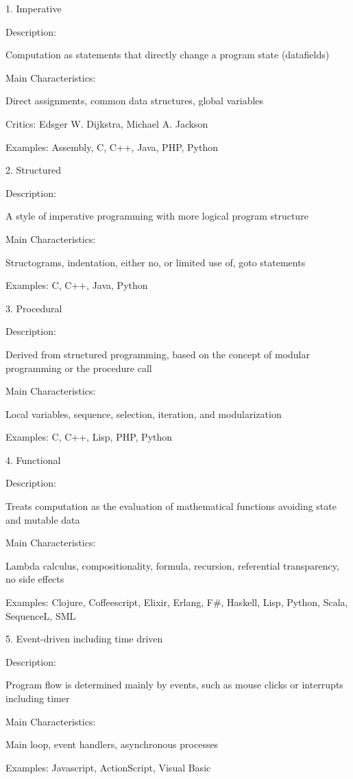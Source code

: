 1. Imperative


Description:

Computation as statements that directly change a program state (datafields)

Main Characteristics:

Direct assignments, common data structures, global variables

Critics: Edsger W. Dijkstra, Michael A. Jackson

Examples: Assembly, C, C++, Java, PHP, Python

2. Structured

Description:

A style of imperative programming with more logical program structure

Main Characteristics:

Structograms, indentation, either no, or limited use of, goto statements

Examples: C, C++, Java, Python

3. Procedural

Description:

Derived from structured programming, based on the concept of modular programming or the procedure call

Main Characteristics:

Local variables, sequence, selection, iteration, and modularization

Examples: C, C++, Lisp, PHP, Python

4. Functional


Description:

Treats computation as the evaluation of mathematical functions avoiding state and mutable data

Main Characteristics:

Lambda calculus, compositionality, formula, recursion, referential transparency, no side effects

Examples: Clojure, Coffeescript, Elixir, Erlang, F#, Haskell, Lisp, Python, Scala, SequenceL, SML

5. Event-driven including time driven

Description:

Program flow is determined mainly by events, such as mouse clicks or interrupts including timer

Main Characteristics:

Main loop, event handlers, asynchronous processes

Examples: Javascript, ActionScript, Visual Basic

